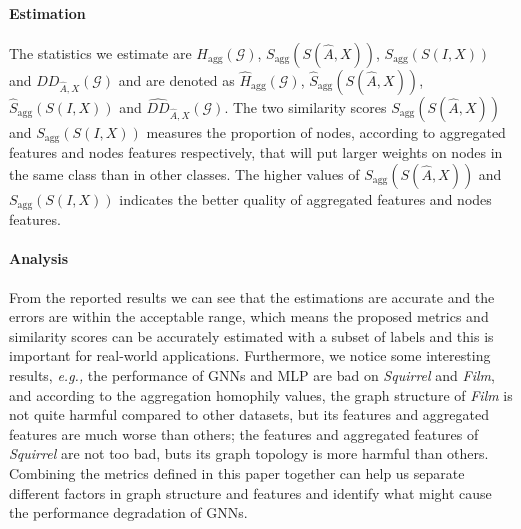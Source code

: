 \documentclass{article}
\newcommand\eg{\textit{e.g.,}}
\newcommand{\0}{{\boldsymbol{0}}}
\newcommand{\6}{{\partial}}
\newcommand{\8}{{\infty}}
\newcommand{\4}{{\nabla}}
\begin{document}
\paragraph{Estimation} The statistics we estimate are $H_\text{agg}(\mathcal{G})$, $S_\text{agg}\left(S(\hat{A},X)\right)$, $S_\text{agg}\left(S(I,X)\right)$ and $DD_{\hat{A},X}(\mathcal{G})$ and are denoted as $\hat{H}_\text{agg}(\mathcal{G})$, $\hat{S}_\text{agg}\left(S(\hat{A},X)\right)$, $\hat{S}_\text{agg}\left(S(I,X)\right)$ and $\hat{DD}_{\hat{A},X}(\mathcal{G})$. The two similarity scores $S_\text{agg}\left(S(\hat{A},X)\right)$ and $S_\text{agg}\left(S(I,X)\right)$ measures the proportion of nodes, according to aggregated features and nodes features respectively, that will put larger weights on nodes in the same class than in other classes. The higher values of $S_\text{agg}\left(S(\hat{A},X)\right)$ and $S_\text{agg}\left(S(I,X)\right)$ indicates the better quality of aggregated features and nodes features.
\paragraph{Analysis}
From the reported results we can see that the estimations are accurate and the errors are within the acceptable range, which means the proposed metrics and similarity scores can be accurately estimated with a subset of labels and this is important for real-world applications. Furthermore, we notice some interesting results, \eg{} the performance of GNNs and MLP are bad on \textit{Squirrel} and \textit{Film}, and according to the aggregation homophily values, the graph structure of \textit{Film} is not quite harmful compared to other datasets, but its features and aggregated features are much worse than others; the features and aggregated features of \textit{Squirrel} are not too bad, buts its graph topology is more harmful than others. Combining the metrics defined in this paper together can help us separate different factors in graph structure and features and identify what might cause the performance degradation of GNNs.
\end{document}
